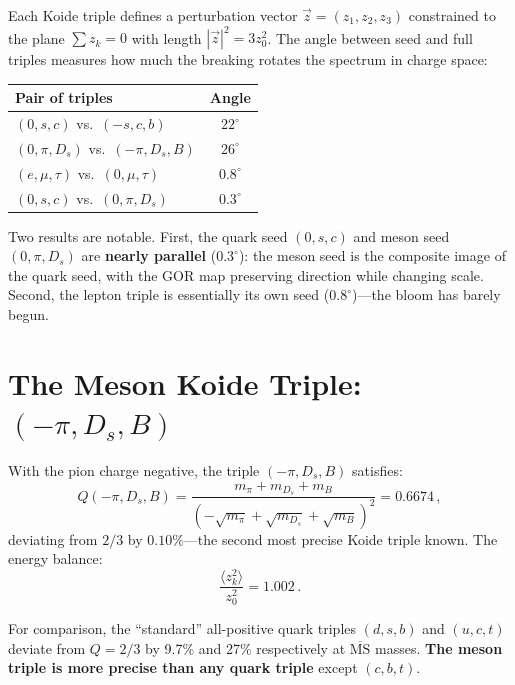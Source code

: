 \documentclass[12pt,a4paper]{article}
\begin{document}
Each Koide triple defines a perturbation vector 
$\vec{z} = (z_1, z_2, z_3)$ constrained to the plane $\sum z_k = 0$ 
with length $|\vec{z}|^2 = 3z_0^2$. The angle between seed and 
full triples measures how much the breaking rotates the spectrum 
in charge space:

\begin{center}
\begin{tabular}{lc}
\toprule
Pair of triples & Angle \\
\midrule
$(0,s,c)$ vs.\ $(-s,c,b)$ & $22^\circ$ \\
$(0,\pi,D_s)$ vs.\ $(-\pi,D_s,B)$ & $26^\circ$ \\
$(e,\mu,\tau)$ vs.\ $(0,\mu,\tau)$ & $0.8^\circ$ \\
$(0,s,c)$ vs.\ $(0,\pi,D_s)$ & $0.3^\circ$ \\
\bottomrule
\end{tabular}
\end{center}

Two results are notable. First, the quark seed $(0,s,c)$ and meson 
seed $(0,\pi,D_s)$ are \textbf{nearly parallel} ($0.3^\circ$): the 
meson seed is the composite image of the quark seed, with the GOR 
map preserving direction while changing scale. Second, the lepton 
triple is essentially its own seed ($0.8^\circ$)---the bloom has 
barely begun.


\section{The Meson Koide Triple: $(-\pi, D_s, B)$}
\label{sec:mesonkoide}

With the pion charge negative, the triple $(-\pi, D_s, B)$ satisfies:
\begin{equation}
Q(-\pi, D_s, B) = 
\frac{m_\pi + m_{D_s} + m_B}{(-\sqrt{m_\pi} + \sqrt{m_{D_s}} + \sqrt{m_B})^2}
= 0.6674\,,
\end{equation}
deviating from $2/3$ by $0.10\%$---the second most precise Koide 
triple known. The energy balance:
\begin{equation}
\frac{\langle z_k^2\rangle}{z_0^2} = 1.002\,.
\end{equation}

For comparison, the ``standard'' all-positive quark triples $(d,s,b)$ 
and $(u,c,t)$ deviate from $Q = 2/3$ by 9.7\% and 27\% respectively 
at $\overline{\text{MS}}$ masses. \textbf{The meson triple is more 
precise than any quark triple} except $(c,b,t)$.
\end{document}
